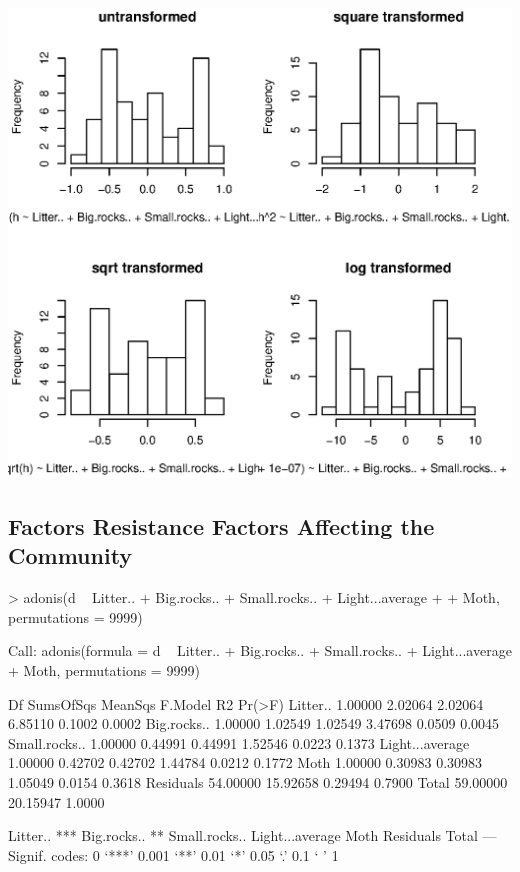 \documentclass[a4paper]{article}
\begin{document}
\includegraphics{SCRL_tex-017}

\subsection{Factors Resistance Factors Affecting the Community}
\begin{Schunk}
\begin{Sinput}
> adonis(d ~ Litter.. + Big.rocks.. + Small.rocks.. + Light...average + 
+     Moth, permutations = 9999)
\end{Sinput}
\begin{Soutput}
Call:
adonis(formula = d ~ Litter.. + Big.rocks.. + Small.rocks.. +      Light...average + Moth, permutations = 9999) 

                      Df SumsOfSqs  MeanSqs  F.Model     R2 Pr(>F)
Litter..         1.00000   2.02064  2.02064  6.85110 0.1002 0.0002
Big.rocks..      1.00000   1.02549  1.02549  3.47698 0.0509 0.0045
Small.rocks..    1.00000   0.44991  0.44991  1.52546 0.0223 0.1373
Light...average  1.00000   0.42702  0.42702  1.44784 0.0212 0.1772
Moth             1.00000   0.30983  0.30983  1.05049 0.0154 0.3618
Residuals       54.00000  15.92658  0.29494          0.7900       
Total           59.00000  20.15947                   1.0000       
                   
Litter..        ***
Big.rocks..     ** 
Small.rocks..      
Light...average    
Moth               
Residuals          
Total              
---
Signif. codes:  0 ‘***’ 0.001 ‘**’ 0.01 ‘*’ 0.05 ‘.’ 0.1 ‘ ’ 1 
\end{Soutput}
\end{Schunk}
\end{document}
